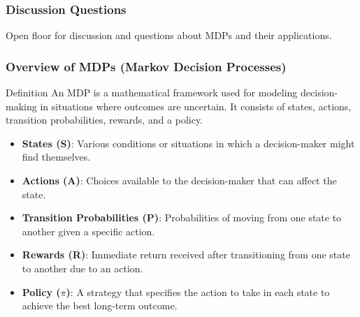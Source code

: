 \documentclass[aspectratio=169]{beamer}
\begin{document}
\begin{frame}[fragile]
    \frametitle{Discussion Questions}
    Open floor for discussion and questions about MDPs and their applications.
\end{frame}

\begin{frame}[fragile]
    \frametitle{Overview of MDPs (Markov Decision Processes)}
    \begin{block}{Definition}
        An MDP is a mathematical framework used for modeling decision-making in situations where outcomes are uncertain. It consists of states, actions, transition probabilities, rewards, and a policy.
    \end{block}
    
    \begin{itemize}
        \item \textbf{States (S)}: Various conditions or situations in which a decision-maker might find themselves.
        \item \textbf{Actions (A)}: Choices available to the decision-maker that can affect the state.
        \item \textbf{Transition Probabilities (P)}: Probabilities of moving from one state to another given a specific action.
        \item \textbf{Rewards (R)}: Immediate return received after transitioning from one state to another due to an action.
        \item \textbf{Policy ($\pi$)}: A strategy that specifies the action to take in each state to achieve the best long-term outcome.
    \end{itemize}
\end{frame}
\end{document}
